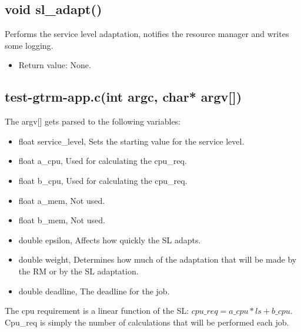 \documentclass[nobiblatex]{LTHthesis}
\begin{document}
\subsection{void sl\_adapt()}
Performs the service level adaptation, notifies the resource manager and writes some logging.
\begin{itemize}
\item Return value: None.
\end{itemize}


\subsection{test-gtrm-app.c(int argc, char* argv[])}
The argv[] gets parsed to the following variables:
\begin{itemize}
		\item float service\_level, Sets the starting value for the service level.
		\item float a\_cpu, Used for calculating the cpu\_req.
		\item float b\_cpu, Used for calculating the cpu\_req.
		\item float a\_mem, Not used.
		\item float b\_mem, Not used.
		\item double epsilon, Affects how quickly the SL adapts.
		\item double weight, Determines how much of the adaptation that will be made by the RM or by the SL adaptation.
		\item double deadline, The deadline for the job.

\end{itemize}
The cpu requirement is a linear function of the SL: $cpu\_req = a\_cpu*ls +b\_cpu  $. Cpu\_req is simply the number of calculations 
that will be performed each job. 
\end{document}
